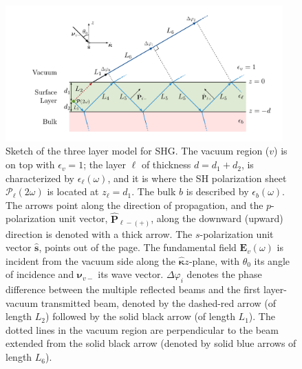 \begin{figure}[t]
\centering 
\includegraphics[width=0.95\textwidth]{content/figures/diag-3layer_MR_2w}
\caption[Sketch of the three layer model for SHG.]
{Sketch of the three layer model for SHG. The vacuum region ($v$) is on top with
$\epsilon_{v}=1$; the layer $\ell$ of thickness $d = d_{1} + d_{2}$, is
characterized by $\epsilon_{\ell}(\omega)$, and it is where the SH polarization
sheet $\boldsymbol{\mathcal{P}}_{\ell}(2\omega)$ is located at $z_{\ell} =
d_{1}$. The bulk $b$ is described by $\epsilon_{b}(\omega)$. The arrows point
along the direction of propagation, and the $p$-polarization unit vector,
$\hat{\mathbf{P}}_{\ell -(+)}$, along the downward (upward) direction is denoted
with a thick arrow. The $s$-polarization unit vector $\hat{\mathbf{s}}$, points
out of the page. The fundamental field $\mathbf{E}_{v}(\omega)$ is incident from
the vacuum side along the $\hat{\boldsymbol{\kappa}}z$-plane, with $\theta_{0}$
its angle of incidence and $\boldsymbol{\nu}_{v-}$ its wave vector.
$\Delta\varphi_{i}$ denotes the phase difference between the multiple reflected
beams and the first layer-vacuum transmitted beam, denoted by the dashed-red
arrow (of length $L_{2}$) followed by the solid black arrow (of length $L_{1}$).
The dotted lines in the vacuum region are perpendicular to the beam extended
from the solid black arrow (denoted by solid blue arrows of length $L_{6}$).}
\label{fig:MR3layer2w}
\end{figure}


